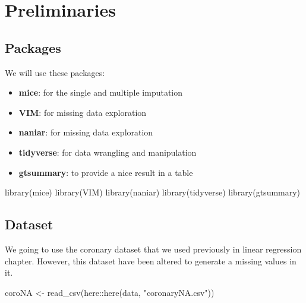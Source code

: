 \documentclass[
  10pt,
]{krantz}
\newenvironment{Shaded}{\begin{snugshade}}{\end{snugshade}}
\newcommand{\FunctionTok}[1]{\textcolor[rgb]{0.00,0.00,0.00}{#1}}
\newcommand{\NormalTok}[1]{#1}
\newcommand{\OtherTok}[1]{\textcolor[rgb]{0.56,0.35,0.01}{#1}}
\newcommand{\SpecialCharTok}[1]{\textcolor[rgb]{0.00,0.00,0.00}{#1}}
\newcommand{\StringTok}[1]{\textcolor[rgb]{0.31,0.60,0.02}{#1}}
\providecommand{\tightlist}{%
  \setlength{\itemsep}{0pt}\setlength{\parskip}{0pt}}
\begin{document}
\hypertarget{preliminaries}{%
\section{Preliminaries}\label{preliminaries}}

\hypertarget{packages-2}{%
\subsection{Packages}\label{packages-2}}

We will use these packages:

\begin{itemize}
\tightlist
\item
  \textbf{mice}: for the single and multiple imputation
\item
  \textbf{VIM}: for missing data exploration
\item
  \textbf{naniar}: for missing data exploration
\item
  \textbf{tidyverse}: for data wrangling and manipulation
\item
  \textbf{gtsummary}: to provide a nice result in a table
\end{itemize}

\begin{Shaded}
\begin{Highlighting}[]
\FunctionTok{library}\NormalTok{(mice)}
\FunctionTok{library}\NormalTok{(VIM)}
\FunctionTok{library}\NormalTok{(naniar)}
\FunctionTok{library}\NormalTok{(tidyverse)}
\FunctionTok{library}\NormalTok{(gtsummary)}
\end{Highlighting}
\end{Shaded}

\hypertarget{dataset-6}{%
\subsection{Dataset}\label{dataset-6}}

We going to use the coronary dataset that we used previously in linear regression chapter. However, this dataset have been altered to generate a missing values in it.

\begin{Shaded}
\begin{Highlighting}[]
\NormalTok{coroNA }\OtherTok{\textless{}{-}} \FunctionTok{read\_csv}\NormalTok{(here}\SpecialCharTok{::}\FunctionTok{here}\NormalTok{(}\StringTok{\textquotesingle{}data\textquotesingle{}}\NormalTok{, }\StringTok{"coronaryNA.csv"}\NormalTok{))}
\end{Highlighting}
\end{Shaded}
\end{document}
